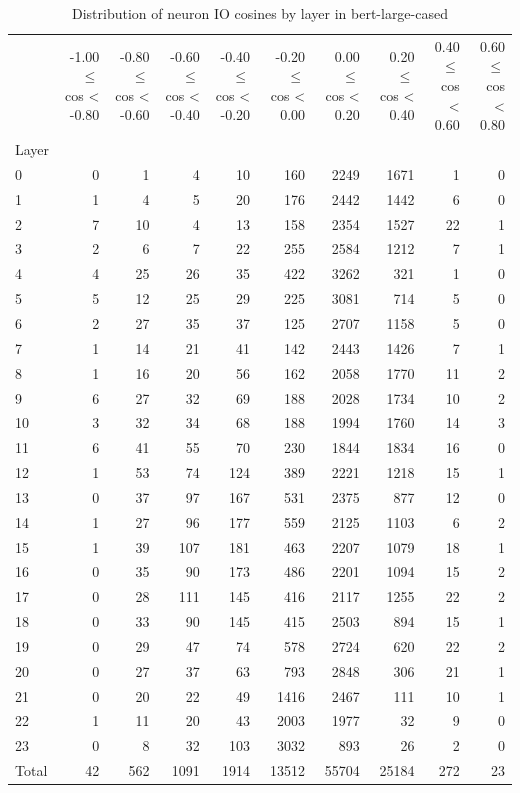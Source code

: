 \begin{table}
\caption{Distribution of neuron IO cosines by layer in bert-large-cased}
\label{tab:bert-large-cased_half_coarse}
\begin{tabular}{lrrrrrrrrr}
 & -1.00 $\leq$ cos < -0.80 & -0.80 $\leq$ cos < -0.60 & -0.60 $\leq$ cos < -0.40 & -0.40 $\leq$ cos < -0.20 & -0.20 $\leq$ cos < 0.00 & 0.00 $\leq$ cos < 0.20 & 0.20 $\leq$ cos < 0.40 & 0.40 $\leq$ cos < 0.60 & 0.60 $\leq$ cos < 0.80 \\
Layer &  &  &  &  &  &  &  &  &  \\
0 & 0 & 1 & 4 & 10 & 160 & 2249 & 1671 & 1 & 0 \\
1 & 1 & 4 & 5 & 20 & 176 & 2442 & 1442 & 6 & 0 \\
2 & 7 & 10 & 4 & 13 & 158 & 2354 & 1527 & 22 & 1 \\
3 & 2 & 6 & 7 & 22 & 255 & 2584 & 1212 & 7 & 1 \\
4 & 4 & 25 & 26 & 35 & 422 & 3262 & 321 & 1 & 0 \\
5 & 5 & 12 & 25 & 29 & 225 & 3081 & 714 & 5 & 0 \\
6 & 2 & 27 & 35 & 37 & 125 & 2707 & 1158 & 5 & 0 \\
7 & 1 & 14 & 21 & 41 & 142 & 2443 & 1426 & 7 & 1 \\
8 & 1 & 16 & 20 & 56 & 162 & 2058 & 1770 & 11 & 2 \\
9 & 6 & 27 & 32 & 69 & 188 & 2028 & 1734 & 10 & 2 \\
10 & 3 & 32 & 34 & 68 & 188 & 1994 & 1760 & 14 & 3 \\
11 & 6 & 41 & 55 & 70 & 230 & 1844 & 1834 & 16 & 0 \\
12 & 1 & 53 & 74 & 124 & 389 & 2221 & 1218 & 15 & 1 \\
13 & 0 & 37 & 97 & 167 & 531 & 2375 & 877 & 12 & 0 \\
14 & 1 & 27 & 96 & 177 & 559 & 2125 & 1103 & 6 & 2 \\
15 & 1 & 39 & 107 & 181 & 463 & 2207 & 1079 & 18 & 1 \\
16 & 0 & 35 & 90 & 173 & 486 & 2201 & 1094 & 15 & 2 \\
17 & 0 & 28 & 111 & 145 & 416 & 2117 & 1255 & 22 & 2 \\
18 & 0 & 33 & 90 & 145 & 415 & 2503 & 894 & 15 & 1 \\
19 & 0 & 29 & 47 & 74 & 578 & 2724 & 620 & 22 & 2 \\
20 & 0 & 27 & 37 & 63 & 793 & 2848 & 306 & 21 & 1 \\
21 & 0 & 20 & 22 & 49 & 1416 & 2467 & 111 & 10 & 1 \\
22 & 1 & 11 & 20 & 43 & 2003 & 1977 & 32 & 9 & 0 \\
23 & 0 & 8 & 32 & 103 & 3032 & 893 & 26 & 2 & 0 \\
Total & 42 & 562 & 1091 & 1914 & 13512 & 55704 & 25184 & 272 & 23 \\
\end{tabular}
\end{table}
